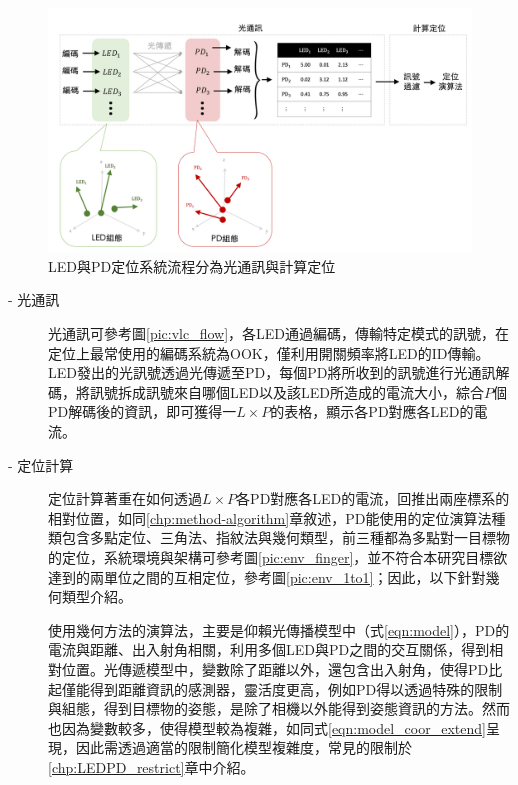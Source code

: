         \begin{figure}[h]
            \centering
            \includegraphics[width=14cm]{ch2pic/lp_system_structure.png}
            \caption{LED與PD定位系統流程分為光通訊與計算定位}
            \label{pic:lp_system_structure}
        \end{figure}

        \begin{description}
            \item[- 光通訊]\hfill
            
            \qquad 
            光通訊可參考圖\ref{pic:vlc_flow}，各LED通過編碼，傳輸特定模式的訊號，在定位上最常使用的編碼系統為OOK，僅利用開關頻率將LED的ID傳輸。LED發出的光訊號透過光傳遞至PD，每個PD將所收到的訊號進行光通訊解碼，將訊號拆成訊號來自哪個LED以及該LED所造成的電流大小，綜合$P$個PD解碼後的資訊，即可獲得一$L\times P$的表格，顯示各PD對應各LED的電流。
            
            \item[- 定位計算] \hfill
            
            \qquad
            定位計算著重在如何透過$L\times P$各PD對應各LED的電流，回推出兩座標系的相對位置，如同\ref{chp:method-algorithm}章敘述，PD能使用的定位演算法種類包含多點定位、三角法、指紋法與幾何類型，前三種都為多點對一目標物的定位，系統環境與架構可參考圖\ref{pic:env_finger}，並不符合本研究目標欲達到的兩單位之間的互相定位，參考圖\ref{pic:env_1to1}；因此，以下針對幾何類型介紹。

            \qquad
            使用幾何方法的演算法，主要是仰賴光傳播模型中（式\ref{eqn:model}），PD的電流與距離、出入射角相關，利用多個LED與PD之間的交互關係，得到相對位置。光傳遞模型中，變數除了距離以外，還包含出入射角，使得PD比起僅能得到距離資訊的感測器，靈活度更高，例如PD得以透過特殊的限制與組態，得到目標物的姿態\cite{case:orient}，是除了相機以外能得到姿態資訊的方法。然而也因為變數較多，使得模型較為複雜，如同式\ref{eqn:model_coor_extend}呈現，因此需透過適當的限制簡化模型複雜度，常見的限制於\ref{chp:LEDPD_restrict}章中介紹。
        \end{description}



